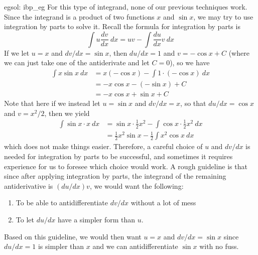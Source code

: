 \begin{egsol}[]{egsol: ibp_eg}
    For this type of integrand, none of our previous techniques work.  Since the integrand is a product of two functions $x$ and $\sin x$, we may try to use integration by parts to solve it. Recall the formula for integration by parts is
    \[\int u\frac{dv}{dx}~dx = uv - \int \frac{du}{dx}v~dx\]
    If we let $u = x$ and $dv/dx = \sin x$, then $du/dx = 1$ and $v = -\cos x + C$ (where we can just take one of the antiderivate and let $C = 0$), so we have
    \begin{align*}
        \int x\sin x~dx &= x(-\cos x) - \int 1 \cdot (-\cos x)~dx\\
        &= -x\cos x - (-\sin x) + C\\
        &= -x\cos x + \sin x + C
    \end{align*}
    Note that here if we instead let $u = \sin x$ and $dv/dx = x$, so that $du/dx = \cos x$ and $v = x^2/2$, then we yield
    \begin{align*}
        \int \sin x \cdot x~dx &= \sin x \cdot \frac{1}{2}x^2 - \int \cos x \cdot \frac{1}{2}x^2~dx\\
        &= \frac{1}{2}x^2 \sin x - \frac{1}{2}\int x^2\cos x~dx
    \end{align*}
    which does not make things easier.  Therefore, a careful choice of $u$ and $dv/dx$ is needed for integration by parts to be successful, and sometimes it requires experience for us to foresee which choice would work.  A rough guideline is that since after applying integration by parts, the integrand of the remaining antiderivative is $(du/dx) v$, we would want the following:
    \begin{enumerate}
        \item To be able to antidifferentiate $dv/dx$ without a lot of mess
        \item To let $du/dx$ have a simpler form than $u$.
    \end{enumerate}
    Based on this guideline, we would then want $u = x$ and $dv/dx = \sin x$ since $du/dx = 1$ is simpler than $x$ and we can antidifferentiate $\sin x$ with no fuss.
\end{egsol}

